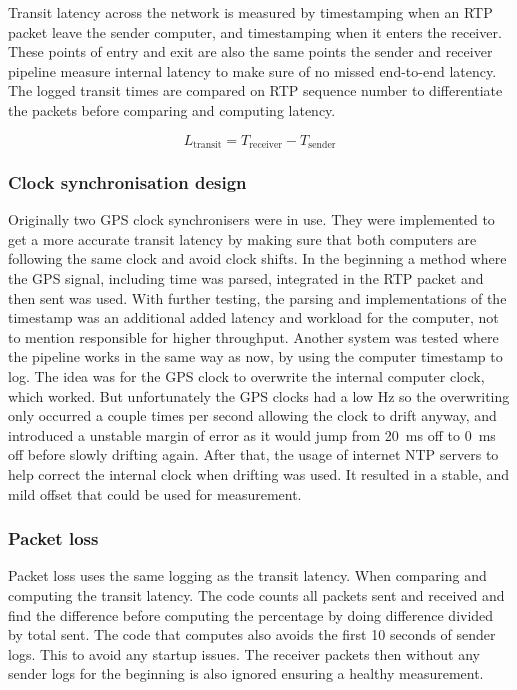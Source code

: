 Transit latency across the network is measured by timestamping when an RTP packet leave the sender computer, and timestamping when it enters the receiver. These points of entry and exit are also the same points the sender and receiver pipeline measure internal latency to make sure of no missed end-to-end latency. The logged transit times are compared on RTP sequence number to differentiate the packets before comparing and computing latency.

\begin{equation}
  L_{\text{transit}}  = T_{\text{receiver}} - T_{\text{sender}}
\end{equation}

\subsubsection{Clock synchronisation design}
Originally two GPS clock synchronisers were in use. They were implemented to get a more accurate transit latency by making sure that both computers are following the same clock and avoid clock shifts. In the beginning a method where the GPS signal, including time was parsed, integrated in the RTP packet and then sent was used. With further testing, the parsing and implementations of the timestamp was an additional added latency and workload for the computer, not to mention responsible for higher throughput. Another system was tested where the pipeline works in the same way as now, by using the computer timestamp to log. The idea was for the GPS clock to overwrite the internal computer clock, which worked. But unfortunately the GPS clocks had a low Hz so the overwriting only occurred a couple times per second allowing the clock to drift anyway, and introduced a unstable margin of error as it would jump from 20~ms off to 0~ms off before slowly drifting again. After that, the usage of internet NTP servers to help correct the internal clock when drifting was used. It resulted in a stable, and mild offset that could be used for measurement.

\subsubsection{Packet loss}
Packet loss uses the same logging as the transit latency. When comparing and computing the transit latency. The code counts all packets sent and received and find the difference before computing the percentage by doing difference divided by total sent. The code that computes also avoids the first 10 seconds of sender logs. This to avoid any startup issues. The receiver packets then without any sender logs for the beginning is also ignored ensuring a healthy measurement.

